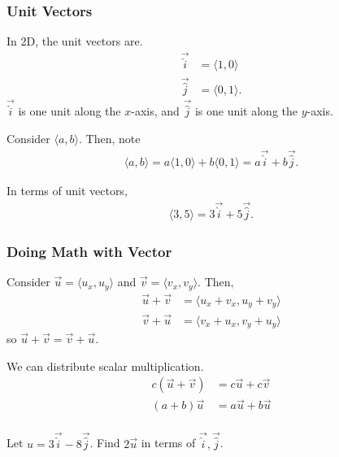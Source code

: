 \documentclass[20pt]{beamer}
\begin{document}
\begin{frame}
	\frametitle{Unit Vectors}
	\begin{definition}
		In 2D, the unit vectors are.
		\begin{align*}
			\vec{\hat{i}} & = \langle 1, 0 \rangle  \\
			\vec{\hat{j}} & = \langle 0, 1 \rangle.
		\end{align*}
		$\vec{\hat{i}}$ is one unit along the $x$-axis, and $\vec{\hat{j}}$ is one unit along the $y$-axis.
	\end{definition}
	\begin{theorem}
		Consider $\langle a, b\rangle$.
		Then, note
		\begin{align*}
			\langle a, b \rangle = a \langle 1, 0\rangle + b \langle 0, 1\rangle = a\vec{\hat{i}} + b \vec{\hat{j}}.
		\end{align*}
	\end{theorem}
	\begin{example}
		In terms of unit vectors,
		\begin{align*}
			\langle 3, 5\rangle = 3\vec{\hat{i}} + 5 \vec{\hat{j}}.
		\end{align*}
	\end{example}
\end{frame}

\begin{frame}
	\frametitle{Doing Math with Vector}
	\begin{theorem}
		Consider $\vec{u} = \langle u_x, u_y \rangle$ and $\vec{v} = \langle v_x, v_y \rangle$.
		Then,
		\begin{align*}
			\vec{u} + \vec{v} & = \langle u_x + v_x, u_y + v_y \rangle \\
			\vec{v} + \vec{u} & = \langle v_x + u_x, v_y + u_y \rangle
		\end{align*}
		so $\vec{u} + \vec{v} = \vec{v} + \vec{u}$.
	\end{theorem}
	\begin{theorem}
		We can distribute scalar multiplication.
		\begin{align*}
			c(\vec{u} + \vec{v}) & = c \vec{u} + c \vec{v} \\
			(a + b)\vec{u}       & = a \vec{u} + b \vec{u} \\
		\end{align*}
	\end{theorem}
	\begin{example}
		Let $u = 3 \vec{\hat{i}} - 8 \vec{\hat{j}}$. Find $2 \vec{u}$ in terms of $\vec{\hat{i}}, \vec{\hat{j}}$.
	\end{example}
\end{frame}
\end{document}
